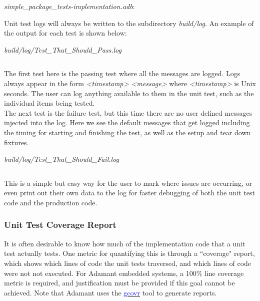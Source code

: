 \textit{simple\_package\_tests-implementation.adb}:


Unit test logs will always be written to the subdirectory \textit{build/log}. An example of the output for each test is shown below:

\vspace{5mm} %
\textit{build/log/Test\_That\_Should\_Pass.log}
\inputminted{text}{../example_architecture/simple_package/test_better4/build/log/Test_That_Should_Pass.log}
\vspace{5mm} %

The first test here is the passing test where all the messages are logged. Logs always appear in the form \textit{<timestamp> <message>} where \textit{<timestamp>} is Unix seconds. The user can log anything available to them in the unit test, such as the individual items being tested. \\

The next test is the failure test, but this time there are no user defined messages injected into the log. Here we see the default messages that get logged including the timing for starting and finishing the test, as well as the setup and tear down fixtures.

\vspace{5mm} %
\textit{build/log/Test\_That\_Should\_Fail.log}
\inputminted{text}{../example_architecture/simple_package/test_better4/build/log/Test_That_Should_Fail.log}
\vspace{5mm} %

This is a simple but easy way for the user to mark where issues are occurring, or even print out their own data to the log for faster debugging of both the unit test code and the production code.

\subsubsection{Unit Test Coverage Report} \label{Unit Test Coverage Report}

It is often desirable to know how much of the implementation code that a unit test actually tests. One metric for quantifying this is through a ``coverage" report, which shows which lines of code the unit tests traversed, and which lines of code were not not executed. For Adamant embedded systems, a 100\% line coverage metric is required, and justification must be provided if this goal cannot be achieved. Note that Adamant uses the \href{https://gcovr.com/en/stable/}{\textcolor{blue}{gcovr}} tool to generate reports. \\


